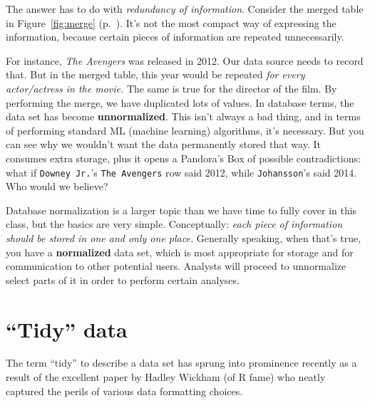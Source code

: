 The answer has to do with \textit{redundancy of information}. Consider the
merged table in Figure~\ref{fig:merge} (p.~\pageref{fig:merge}). It's not the
most compact way of expressing the information, because certain pieces of
information are repeated unnecessarily.

For instance, \textit{The Avengers} was released in 2012. Our data source
needs to record that. But in the merged table, this year would be repeated
\textit{for every actor/actress in the movie.} The same is true for the
director of the film. By performing the merge, we have duplicated lots of
values. In database terms, the data set has become \textbf{unnormalized}. This
isn't always a bad thing, and in terms of performing standard ML (machine
learning) algorithms, it's necessary. But you can see why we wouldn't want the
data permanently stored that way. It consumes extra storage, plus it opens a
Pandora's Box of possible contradictions: what if \texttt{Downey Jr.}'s
\texttt{The Avengers} row said 2012, while \texttt{Johansson}'s said 2014. Who
would we believe?

Database normalization is a larger topic than we have time to fully cover in
this class, but the basics are very simple. Conceptually: \textit{each piece
of information should be stored in one and only one place.} Generally
speaking, when that's true, you have a \textbf{normalized} data set, which is
most appropriate for storage and for communication to other potential users.
Analysts will proceed to unnormalize select parts of it in order to perform
certain analyses.

\section{``Tidy'' data}

The term ``tidy'' to describe a data set has sprung into prominence recently
as a result of the excellent paper by Hadley Wickham (of R fame) who neatly
captured the perils of various data formatting choices.

